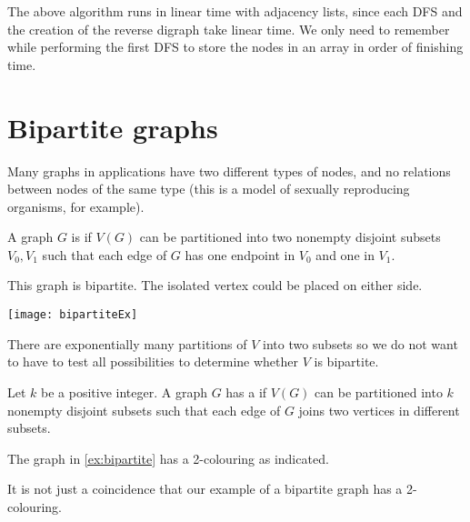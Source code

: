 The above algorithm runs in linear time with adjacency lists, since each
DFS and the creation of the reverse digraph take linear time. We only
need to remember  while performing the first DFS to store the nodes in
an array in order of finishing time. 

\section{Bipartite graphs}

Many graphs in applications have two different types of nodes, and no
relations between nodes of the same type (this is a model of sexually
reproducing organisms, for example).

\begin{Definition}
A graph $G$ is  if $V(G)$  can be partitioned into
two nonempty disjoint subsets $V_0, V_1$ such that each edge of $G$
has one endpoint in $V_0$ and one in $V_1$.
\end{Definition}

\begin{Boxample} \label{ex:bipartite}
This graph is bipartite.  
The isolated vertex could be placed on either side.
\begin{center}
\texttt{[image: bipartiteEx]} 
\end{center}
\end{Boxample}

There are exponentially many partitions of $V$ into two subsets so we
do not want to have to test all possibilities to determine whether $V$ is bipartite.

\begin{Definition}
Let $k$ be a positive integer. A graph $G$ has a 
if $V(G)$ can be partitioned into $k$ nonempty disjoint subsets such
that each edge of $G$ joins two vertices in different subsets.
\end{Definition}

\begin{Example}
The graph in \cref{ex:bipartite} has a 2-colouring as indicated.
\end{Example}

It is not just a coincidence that our example of a bipartite graph
has a 2-colouring.

